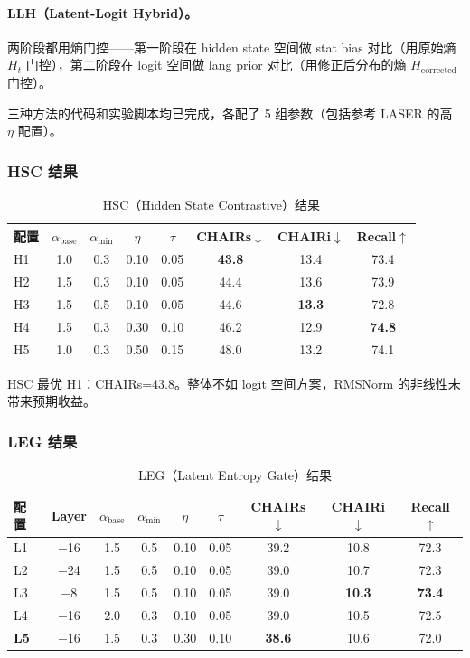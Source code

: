 \documentclass[12pt,a4paper]{ctexart}
\begin{document}
\paragraph{LLH（Latent-Logit Hybrid）。}
两阶段都用熵门控——第一阶段在 hidden state 空间做 stat bias 对比（用原始熵 $H_t$ 门控），第二阶段在 logit 空间做 lang prior 对比（用修正后分布的熵 $H_{\text{corrected}}$ 门控）。

三种方法的代码和实验脚本均已完成，各配了 5 组参数（包括参考 LASER 的高 $\eta$ 配置）。

\subsubsection{HSC 结果}

\begin{table}[H]
\centering
\caption{HSC（Hidden State Contrastive）结果}
\label{tab:hsc}
\begin{tabular}{lccccccc}
\toprule
\textbf{配置} & $\alpha_{\text{base}}$ & $\alpha_{\min}$ & $\eta$ & $\tau$ & \textbf{CHAIRs$\downarrow$} & \textbf{CHAIRi$\downarrow$} & \textbf{Recall$\uparrow$} \\
\midrule
H1 & 1.0 & 0.3 & 0.10 & 0.05 & \textbf{43.8} & 13.4 & 73.4 \\
H2 & 1.5 & 0.3 & 0.10 & 0.05 & 44.4 & 13.6 & 73.9 \\
H3 & 1.5 & 0.5 & 0.10 & 0.05 & 44.6 & \textbf{13.3} & 72.8 \\
H4 & 1.5 & 0.3 & 0.30 & 0.10 & 46.2 & 12.9 & \textbf{74.8} \\
H5 & 1.0 & 0.3 & 0.50 & 0.15 & 48.0 & 13.2 & 74.1 \\
\bottomrule
\end{tabular}
\end{table}

HSC 最优 H1：CHAIRs=43.8。整体不如 logit 空间方案，RMSNorm 的非线性未带来预期收益。

\subsubsection{LEG 结果}

\begin{table}[H]
\centering
\caption{LEG（Latent Entropy Gate）结果}
\label{tab:leg}
\begin{tabular}{lcccccccc}
\toprule
\textbf{配置} & \textbf{Layer} & $\alpha_{\text{base}}$ & $\alpha_{\min}$ & $\eta$ & $\tau$ & \textbf{CHAIRs$\downarrow$} & \textbf{CHAIRi$\downarrow$} & \textbf{Recall$\uparrow$} \\
\midrule
L1 & $-$16 & 1.5 & 0.5 & 0.10 & 0.05 & 39.2 & 10.8 & 72.3 \\
L2 & $-$24 & 1.5 & 0.5 & 0.10 & 0.05 & 39.0 & 10.7 & 72.3 \\
L3 & $-$8  & 1.5 & 0.5 & 0.10 & 0.05 & 39.0 & \textbf{10.3} & \textbf{73.4} \\
L4 & $-$16 & 2.0 & 0.3 & 0.10 & 0.05 & 39.0 & 10.5 & 72.5 \\
\textbf{L5} & $-$16 & 1.5 & 0.3 & 0.30 & 0.10 & \textbf{38.6} & 10.6 & 72.0 \\
\bottomrule
\end{tabular}
\end{table}
\end{document}
